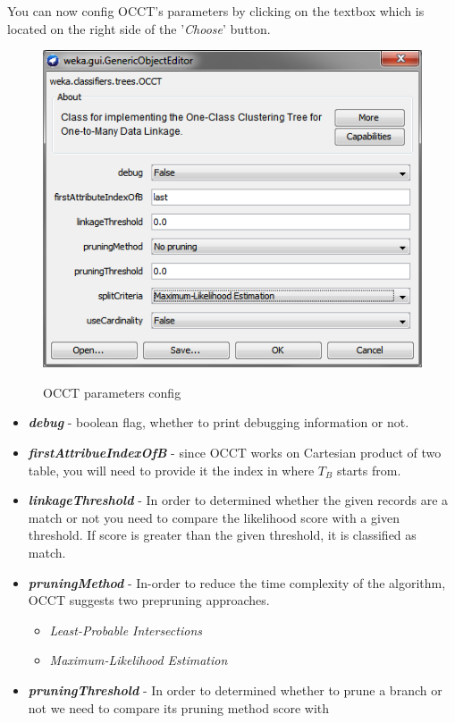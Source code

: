 \documentclass[a4paper,12pt]{article}
\begin{document}
\begin{spacing}{1.5}
You can now config OCCT's parameters by clicking on the textbox which is located on the right side of the '{\em Choose}' button.
\clearpage
\begin{figure}[!h]
  \centering
  \includegraphics{Figures/GUI/OCCTConfig}\\
  \caption{OCCT parameters config}
  \label{fig:occtconf}
\end{figure}
\begin{itemize}
  \item \textbf{{\em debug}} - boolean flag, whether to print debugging information or not.
  \item \textbf{{\em firstAttribueIndexOfB}} - since OCCT works on Cartesian product of two table, you will need to provide it the
  index in where $T_{B}$ starts from.
  \item \textbf{{\em linkageThreshold}} - In order to determined whether the given records are a match or not you need to compare the likelihood
  score with a given threshold. If score is greater than the given threshold, it is classified as match.
  \item \textbf{{\em pruningMethod}} - In-order to reduce the time complexity of the algorithm, OCCT suggests two prepruning approaches.
  \begin{itemize}
    \item {\em Least-Probable Intersections}
    \item {\em Maximum-Likelihood Estimation}
  \end{itemize}
  \item \textbf{{\em pruningThreshold}} - In order to determined whether to prune a branch or not we need to compare its pruning method score with

\end{itemize}
\end{spacing}
\end{document}

